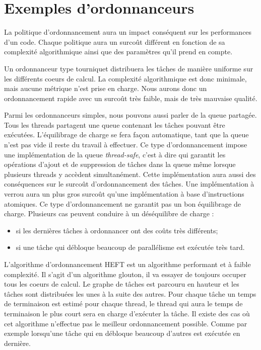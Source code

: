 \section{Exemples d'ordonnanceurs}
La politique d'ordonnancement aura un impact conséquent sur les performances d'un code.
%
Chaque politique aura un surcoût différent en fonction de sa complexité algorithmique ainsi que des paramètres qu'il prend en compte.



Un ordonnanceur type tourniquet distribuera les tâches de manière uniforme sur les différents coeurs de calcul.
%
La complexité algorithmique est donc minimale, mais aucune métrique n'est prise en charge.
%
Nous aurons donc un ordonnancement rapide avec un surcoût très faible, mais de très mauvaise qualité.



Parmi les ordonnanceurs simples, nous pouvons aussi parler de la queue partagée.
%
Tous les threads partagent une queue contenant les tâches pouvant être exécutées.
%
L'équilibrage de charge se fera façon automatique, tant que la queue n'est pas vide il reste du travail à effectuer.
%
Ce type d'ordonnancement impose une implémentation de la queue {\em thread-safe}, c'est à dire qui garantit les opérations d'ajout et de suppression de tâches dans la queue même lorsque plusieurs threads y accèdent simultanément.
%
Cette implémentation aura aussi des conséquences sur le surcoût d'ordonnancement des tâches.
%
Une implémentation à verrou aura un plus gros surcoût qu'une implémentation à base d'instructions atomiques.
%
Ce type d'ordonnancement ne garantit pas un bon équilibrage de charge.
%
Plusieurs cas peuvent conduire à un déséquilibre de charge :
\begin{itemize}
  \item si les dernières tâches à ordonnancer ont des coûts très différents;
  \item si une tâche qui débloque beaucoup de parallélisme est exécutée très tard.
\end{itemize}



L'algorithme d'ordonnancement HEFT est un algorithme performant et à faible complexité\cite{heft2}.
%
Il s'agit d'un algorithme glouton, il va essayer de toujours occuper tous les coeurs de calcul.
%
Le graphe de tâches est parcouru en hauteur et les tâches sont distribuées les unes à la suite des autres.
%
Pour chaque tâche un temps de terminaison est estimé pour chaque thread, le thread qui aura le temps de terminaison le plus court sera en charge d'exécuter la tâche.
%
Il existe des cas où cet algorithme n'effectue pas le meilleur ordonnancement possible.
%
Comme par exemple lorsqu'une tâche qui en débloque beaucoup d'autres est exécutée en dernière.
